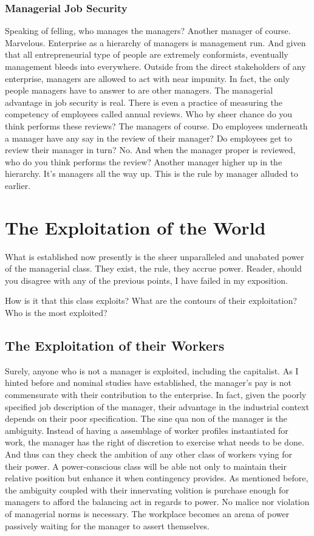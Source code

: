 \documentclass[12pt]{article}
\begin{document}
\subsubsection{Managerial Job Security}
Speaking of felling, who manages the managers?
Another manager of course.
Marvelous.
Enterprise as a hierarchy of managers is management run.
And given that all entrepreneurial type of people are extremely conformists, eventually management bleeds into everywhere.
Outside from the direct stakeholders of any enterprise, managers are allowed to act with near impunity.
In fact, the only people managers have to answer to are other managers.
The managerial advantage in job security is real.
There is even a practice of measuring the competency of employees called annual reviews.
Who by sheer chance do you think performs these reviews?
The managers of course.
Do employees underneath a manager have any say in the review of their manager?
Do employees get to review their manager in turn?
No.
And when the manager proper is reviewed, who do you think performs the review?
Another manager higher up in the hierarchy.
It's managers all the way up.
This is the rule by manager alluded to earlier.

\section{The Exploitation of the World}
What is established now presently is the sheer unparalleled and unabated power of the managerial class.
They exist, the rule, they accrue power.
Reader, should you disagree with any of the previous points, I have failed in my exposition.

How is it that this class exploits?
What are the contours of their exploitation?
Who is the most exploited?

\subsection{The Exploitation of their Workers}
Surely, anyone who is not a manager is exploited, including the capitalist.
As I hinted before and nominal studies have established, the manager's pay is not commensurate with their contribution to the enterprise.
In fact, given the poorly specified job description of the manager, their advantage in the industrial context depends on their poor specification.
The sine qua non of the manager is the ambiguity.
Instead of having a assemblage of worker profiles instantiated for work, the manager has the right of discretion to exercise what needs to be done.
And thus can they check the ambition of any other class of workers vying for their power.
A power-conscious class will be able not only to maintain their relative position but enhance it when contingency provides.
As mentioned before, the ambiguity coupled with their innervating volition is purchase enough for managers to afford the balancing act in regards to power.
No malice nor violation of managerial norms is necessary.
The workplace becomes an arena of power passively waiting for the manager to assert themselves.
\end{document}
